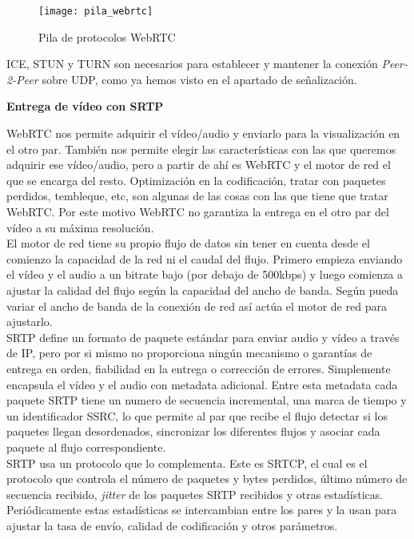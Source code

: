 \begin{figure}[htb]
\centering
\texttt{[image: pila\_webrtc]}
\caption{Pila de protocolos WebRTC}
\label{fig:pila_webrtc}
\end{figure}


ICE, STUN y TURN son necesarios para establecer y mantener la conexión \emph{Peer-2-Peer} sobre UDP, como ya hemos visto en el apartado de señalización.\\

\begin{normalsize}
\noindent \textbf{Entrega de vídeo con SRTP}\\
\end{normalsize}

WebRTC nos permite adquirir el vídeo/audio y enviarlo para la visualización en el otro par. También nos permite elegir las características con las que queremos adquirir ese vídeo/audio, pero a partir de ahí es WebRTC y el motor de red el que se encarga del resto. Optimización en la codificación, tratar con paquetes perdidos, tembleque, etc, son algunas de las cosas con las que tiene que tratar WebRTC. Por este motivo WebRTC no garantiza la entrega en el otro par del vídeo a su máxima resolución.\\

El motor de red tiene su propio flujo de datos sin tener en cuenta desde el comienzo la capacidad de la red ni el caudal del flujo. Primero empieza enviando el vídeo y el audio a un bitrate bajo (por debajo de 500kbps) y luego comienza a ajustar la calidad del flujo según la capacidad del ancho de banda. Según pueda variar el ancho de banda de la conexión de red así actúa el motor de red para ajustarlo.\\

SRTP define un formato de paquete estándar para enviar audio y vídeo a través de IP, pero por si mismo no proporciona ningún mecanismo o garantías de entrega en orden, fiabilidad en la entrega o corrección de errores. Simplemente encapsula el vídeo y el audio con metadata adicional. Entre esta metadata cada paquete SRTP tiene un numero de secuencia incremental, una marca de tiempo y un identificador SSRC, lo que permite al par que recibe el flujo detectar si los paquetes llegan desordenados, sincronizar los diferentes flujos y asociar cada paquete al flujo correspondiente.\\

SRTP usa un protocolo que lo complementa. Este es SRTCP, el cual es el protocolo que controla el número de paquetes y bytes perdidos, último número de secuencia recibido, \emph{jitter} de los paquetes SRTP recibidos y otras estadísticas. Periódicamente estas estadísticas se intercambian entre los pares y la usan para ajustar la tasa de envío, calidad de codificación y otros parámetros.\\

